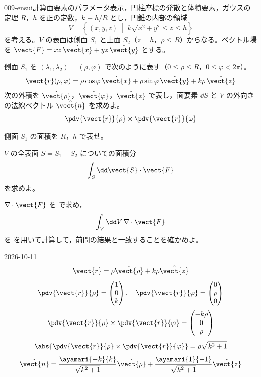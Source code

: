 \documentclass[uplatex,dvipdfmx,a4paper,11pt]{jsarticle}
\begin{document}
\begin{mondai}{009-ensui}{計算}{面要素のパラメータ表示，円柱座標の発散と体積要素，ガウスの定理}
$R$，$h$ を正の定数，$k \equiv h/R$ とし，円錐の内部の領域
  \[ V = \left\{(x,y,z) \;\middle|\; k\sqrt{x^2 + y^2} \le z \le h\right\} \]
  を考える。$V$ の表面は側面 $S_1$ と上面 $S_2$（$z = h$，$\rho \le R$）からなる。ベクトル場を $\vect{F} = xz\,\hat{\vect{x}} + yz\,\hat{\vect{y}}$ とする。
  \begin{shoumon}
    \item 側面 $S_1$ を $(\lambda_1,\lambda_2) = (\rho,\varphi)$ で次のように表す（$0 \le \rho \le R$，$0 \le \varphi < 2\pi$）。
    \[ \vect{r}(\rho,\varphi) = \rho\cos\varphi\,\hat{\vect{x}} + \rho\sin\varphi\,\hat{\vect{y}} + k\rho\,\hat{\vect{z}} \]
    次の外積を $\hat{\vect{\rho}}$，$\hat{\vect{\varphi}}$，$\hat{\vect{z}}$ で表し，面要素 $\dd S$ と $V$ の外向きの法線ベクトル $\hat{\vect{n}}$ を求めよ。
    \[ \pdv{\vect{r}}{\rho}\times\pdv{\vect{r}}{\varphi} \]
    \item 側面 $S_1$ の面積を $R$，$h$ で表せ。
    \item $V$ の全表面 $S = S_1 + S_2$ についての面積分
    \[ \int_S \dd\vect{S}\cdot\vect{F} \]
    を求めよ。
    \item $\nabla\cdot\vect{F}$ を  で求め，
    \[ \int_V \dd V\,\nabla\cdot\vect{F} \]
    を  を用いて計算して，前問の結果と一致することを確かめよ。
  \end{shoumon}
\begin{kotaeutsushi}{2026-10-11}
\[ \vect{r}=\rho\hat{\vect{\rho}}+k\rho\hat{\vect{z}} \]
\[ \pdv{\vect{r}}{\rho}=\begin{pmatrix}1\\0\\k\end{pmatrix},\quad\pdv{\vect{r}}{\varphi}=\begin{pmatrix}0\\\rho\\0\end{pmatrix} \]
\[ \pdv{\vect{r}}{\rho}\times\pdv{\vect{r}}{\varphi}=\begin{pmatrix}-k\rho\\0\\\rho\end{pmatrix} \]
\[ \abs{\pdv{\vect{r}}{\rho}\times\pdv{\vect{r}}{\varphi}}=\rho\sqrt{k^{2}+1} \]
\[ \hat{\vect{n}}=\frac{\ayamari{-k}{k}}{\sqrt{k^{2}+1}}\hat{\vect{\rho}}+\frac{\ayamari{1}{-1}}{\sqrt{k^{2}+1}}\hat{\vect{z}} \]

\end{kotaeutsushi}
\end{mondai}
\end{document}
